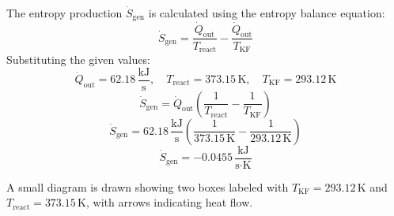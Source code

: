The entropy production \( \dot{S}_{\text{gen}} \) is calculated using the entropy balance equation:  
\[
\dot{S}_{\text{gen}} = \frac{\dot{Q}_{\text{out}}}{T_{\text{react}}} - \frac{\dot{Q}_{\text{out}}}{T_{\text{KF}}}
\]  
Substituting the given values:  
\[
\dot{Q}_{\text{out}} = 62.18 \, \frac{\text{kJ}}{\text{s}}, \quad T_{\text{react}} = 373.15 \, \text{K}, \quad T_{\text{KF}} = 293.12 \, \text{K}
\]  
\[
\dot{S}_{\text{gen}} = \dot{Q}_{\text{out}} \left( \frac{1}{T_{\text{react}}} - \frac{1}{T_{\text{KF}}} \right)
\]  
\[
\dot{S}_{\text{gen}} = 62.18 \, \frac{\text{kJ}}{\text{s}} \left( \frac{1}{373.15 \, \text{K}} - \frac{1}{293.12 \, \text{K}} \right)
\]  
\[
\dot{S}_{\text{gen}} = -0.0455 \, \frac{\text{kJ}}{\text{s·K}}
\]  

A small diagram is drawn showing two boxes labeled with \( T_{\text{KF}} = 293.12 \, \text{K} \) and \( T_{\text{react}} = 373.15 \, \text{K} \), with arrows indicating heat flow.